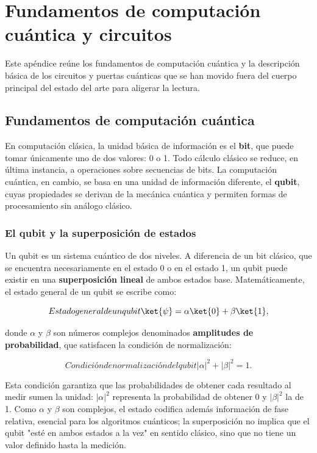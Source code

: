 \chapter{Fundamentos de computación cuántica y circuitos}
\label{ap:fundamentos_cuantica}

Este apéndice reúne los fundamentos de computación cuántica y la descripción básica de los circuitos y puertas cuánticas que se han movido fuera del cuerpo principal del estado del arte para aligerar la lectura.

\section{Fundamentos de computación cuántica}
\label{ap:sec:fundamentos_cuantica}

En computación clásica, la unidad básica de información es el \textbf{bit}, que puede tomar únicamente uno de dos valores: 0 o 1. Todo cálculo clásico se reduce, en última instancia, a operaciones sobre secuencias de bits. La computación cuántica, en cambio, se basa en una unidad de información diferente, el \textbf{qubit}, cuyas propiedades se derivan de la mecánica cuántica y permiten formas de procesamiento sin análogo clásico.

\subsection{El qubit y la superposición de estados}
\label{ap:subsec:qubit_superposicion}

Un qubit es un sistema cuántico de dos niveles. A diferencia de un bit clásico, que se encuentra necesariamente en el estado 0 o en el estado 1, un qubit puede existir en una \textbf{superposición lineal} de ambos estados base. Matemáticamente, el estado general de un qubit se escribe como:

\begin{equation}[ap:eq:qubit]{Estado general de un qubit}
\ket{\psi} = \alpha \ket{0} + \beta \ket{1},
\end{equation}

donde $\alpha$ y $\beta$ son números complejos denominados \textbf{amplitudes de probabilidad}, que satisfacen la condición de normalización:

\begin{equation}[ap:eq:normalizacion]{Condición de normalización del qubit}
|\alpha|^2 + |\beta|^2 = 1.
\end{equation}

Esta condición garantiza que las probabilidades de obtener cada resultado al medir sumen la unidad: $|\alpha|^2$ representa la probabilidad de obtener 0 y $|\beta|^2$ la de 1. Como $\alpha$ y $\beta$ son complejos, el estado codifica además información de fase relativa, esencial para los algoritmos cuánticos; la superposición no implica que el qubit "esté en ambos estados a la vez" en sentido clásico, sino que no tiene un valor definido hasta la medición.

